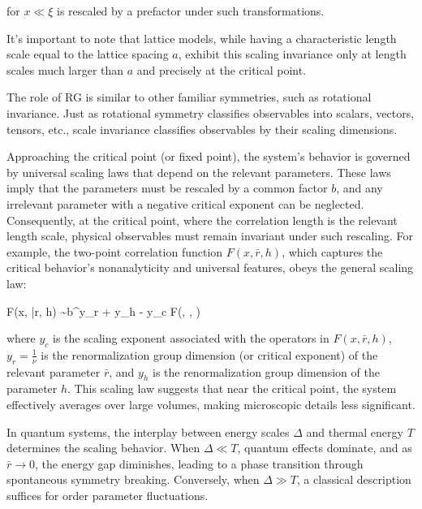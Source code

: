 for $ x \ll \xi $ is rescaled by a prefactor under such transformations.


It's important to note that lattice models, while having a characteristic length scale equal to the lattice spacing $ a $, exhibit this scaling invariance only at length scales much larger than $ a $ and precisely at the critical point.


The role of RG is similar to other familiar symmetries, such as rotational invariance. Just as rotational symmetry classifies observables into scalars, vectors, tensors, etc., scale invariance classifies observables by their scaling dimensions.

Approaching the critical point (or fixed point), the system's behavior is governed by universal scaling laws that depend on the relevant parameters. These laws imply that the parameters must be rescaled by a common factor $ b $, and any irrelevant parameter with a negative critical exponent can be neglected. Consequently, at the critical point, where the correlation length is the relevant length scale, physical observables must remain invariant under such rescaling. For example, the two-point correlation function $ F(x, \bar{r}, h) $, which captures the critical behavior's nonanalyticity and universal features, obeys the general scaling law:

F(x, \bar{r}, h) \sim b^{y_r + y_h - y_c} F\left(, , \right)
\ea

where $ y_c $ is the scaling exponent associated with the operators in $ F(x, \bar{r}, h) $, $ y_r = \frac{1}{\nu} $ is the renormalization group dimension (or critical exponent) of the relevant parameter $ \bar{r} $, and $ y_h $ is the renormalization group dimension of the parameter $ h $. This scaling law suggests that near the critical point, the system effectively averages over large volumes, making microscopic details less significant.

$ $\\

In quantum systems, the interplay between energy scales $ \Delta $ and thermal energy $ T $ determines the scaling behavior. When $ \Delta \ll T $, quantum effects dominate, and as $ \bar{r} \rightarrow 0 $, the energy gap diminishes, leading to a phase transition through spontaneous symmetry breaking. Conversely, when $ \Delta \gg T $, a classical description suffices for order parameter fluctuations.

